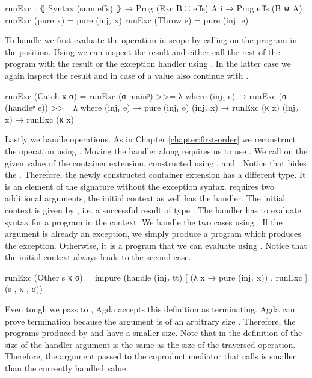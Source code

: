 \begin{code}
runExc : ⦃ Syntax (sum effs) ⦄ → Prog (Exc B ∷ effs) A {i} → Prog effs (B ⊎ A)
runExc (pure x)     = pure (inj₂ x)
runExc (Throw e)    = pure (inj₁ e)
\end{code}
To handle  we first evaluate the operation in
scope by calling  on the program in the
 position.
Using \AgdaFunction{>>=} we can inspect the result and either call the rest of
the program  with the result or the exception handler using
.
In the latter case we again inspect the result and in case of a value also
continue with .
\begin{code}
runExc (Catch κ σ)  = runExc (σ mainᵖ) >>= λ where
  (inj₁ e) → runExc (σ (handleᵖ e)) >>= λ where
    (inj₁ e) → pure (inj₁ e)
    (inj₂ x) → runExc (κ x)
  (inj₂ x) → runExc (κ x)
\end{code}
Lastly we handle  operations.
As in Chapter \ref{chapter:first-order} we reconstruct the operation using
.
Moving the handler along requires us to use .
We call  on the given value of the container extension,
constructed using ,  and .
Notice that  hides the
.
Therefore, the newly constructed container extension has a different type.
It is an element of the signature without the exception syntax.
 requires two additional arguments, the initial context as
well has the handler.
The initial context is given by
\AgdaSpace{}, i.e. a
successful result of type .
The handler has to evaluate  syntax for a program in the
context.
We handle the two cases using \AgdaFunction{[\_,\_]}.
If the argument is already an exception, we simply produce a
 program which produces the exception.
Otherwise, it is a program that we can evaluate using .
Notice that the initial context always leads to the second case.
\begin{code}
runExc (Other s κ σ) = impure (handle (inj₂ tt) [ (λ x → pure (inj₁ x)) , runExc ] (s , κ , σ))
\end{code}
Even tough we pass  to , Agda accepts this
definition as terminating.
Agda can prove termination because the argument is of an arbitrary size
.
Therefore, the programs produced by  and  have a
smaller size.
Note that in the definition of  the size of the handler
argument is the same as the size of the traversed operation.
Therefore, the argument passed to the coproduct mediator that calls
 is smaller than the currently handled value.

